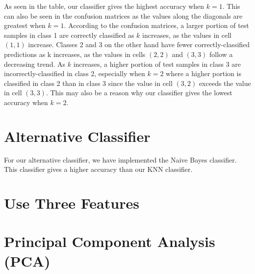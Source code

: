 \documentclass[11pt]{article}
\begin{document}
As seen in the table, our classifier gives the highest accuracy when $k = 1$. This can also be seen in the confusion matrices as the values along the diagonals are greatest when $k = 1$. According to the confusion matrices, a larger portion of test samples in class 1 are correctly classified as $k$ increases, as the values in cell $(1,1)$ increase. Classes 2 and 3 on the other hand have fewer correctly-classified predictions as k increases, as the values in cells $(2,2)$ and $(3,3)$ follow a decreasing trend. As $k$ increases, a higher portion of test samples in class 3 are incorrectly-classified in class 2, especially when $k = 2$ where a higher portion is classified in class 2 than in class 3 since the value in cell $(3,2)$ exceeds the value in cell $(3,3)$. This may also be a reason why our classifier gives the lowest accuracy when $k = 2$.

\section{Alternative Classifier}
For our alternative classifier, we have implemented the Naive Bayes classifier. This classifier gives a higher accuracy than our KNN classifier.
\section{Use Three Features}

\section{Principal Component Analysis (PCA)}
\end{document}
